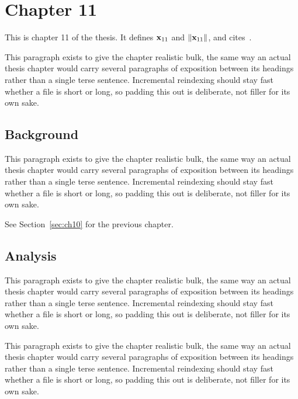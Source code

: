 \section{Chapter 11}
\label{sec:ch11}

This is chapter 11 of the thesis. It defines $\mathbf{x}_{11}$ and $\lVert \mathbf{x}_{11} \rVert$, and cites~\cite{ref1}.

This paragraph exists to give the chapter realistic bulk, the same way an actual thesis chapter would carry several paragraphs of exposition between its headings rather than a single terse sentence. Incremental reindexing should stay fast whether a file is short or long, so padding this out is deliberate, not filler for its own sake.

\subsection{Background}
\label{sec:ch11:background}

This paragraph exists to give the chapter realistic bulk, the same way an actual thesis chapter would carry several paragraphs of exposition between its headings rather than a single terse sentence. Incremental reindexing should stay fast whether a file is short or long, so padding this out is deliberate, not filler for its own sake.

See Section~\ref{sec:ch10} for the previous chapter.

\subsection{Analysis}
\label{sec:ch11:analysis}

This paragraph exists to give the chapter realistic bulk, the same way an actual thesis chapter would carry several paragraphs of exposition between its headings rather than a single terse sentence. Incremental reindexing should stay fast whether a file is short or long, so padding this out is deliberate, not filler for its own sake.

This paragraph exists to give the chapter realistic bulk, the same way an actual thesis chapter would carry several paragraphs of exposition between its headings rather than a single terse sentence. Incremental reindexing should stay fast whether a file is short or long, so padding this out is deliberate, not filler for its own sake.
